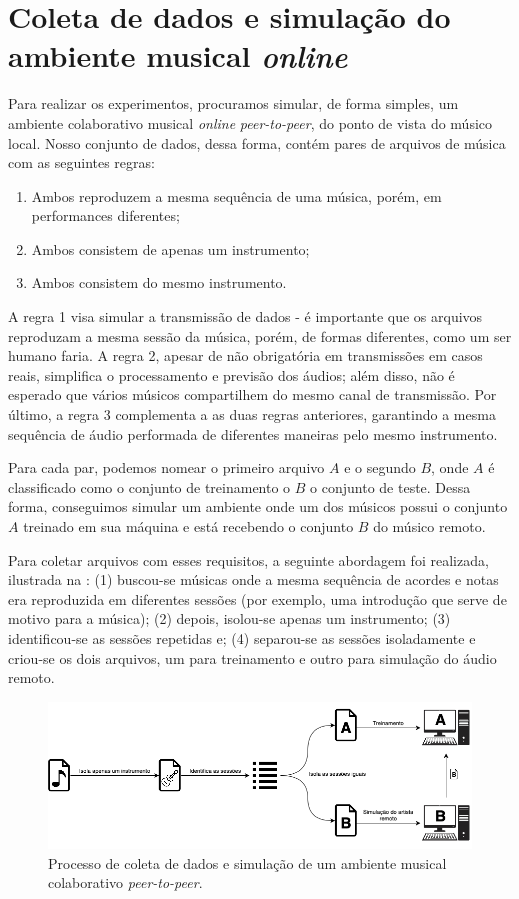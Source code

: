 \section{Coleta de dados e simulação do ambiente musical \textit{online}}

Para realizar os experimentos, procuramos simular, de forma simples, um ambiente colaborativo musical \textit{online} \textit{peer-to-peer}, do ponto de vista do músico local. Nosso conjunto de dados, dessa forma, contém pares de arquivos de música com as seguintes regras:

\begin{enumerate}
    \item Ambos reproduzem a mesma sequência de uma música, porém, em performances diferentes;
    \item Ambos consistem de apenas um instrumento;
    \item Ambos consistem do mesmo instrumento.
\end{enumerate}

A regra 1 visa simular a transmissão de dados - é importante que os arquivos reproduzam a mesma sessão da música, porém, de formas diferentes, como um ser humano faria. A regra 2, apesar de não obrigatória em transmissões em casos reais, simplifica o processamento e previsão dos áudios; além disso, não é esperado que vários músicos compartilhem do mesmo canal de transmissão. Por último, a regra 3 complementa a as duas regras anteriores, garantindo a mesma sequência de áudio performada de diferentes maneiras pelo mesmo instrumento.

Para cada par, podemos nomear o primeiro arquivo $A$ e o segundo $B$, onde $A$ é classificado como o conjunto de treinamento o $B$ o conjunto de teste. Dessa forma, conseguimos simular um ambiente onde um dos músicos possui o conjunto $A$ treinado em sua máquina e está recebendo o conjunto $B$ do músico remoto.

Para coletar arquivos com esses requisitos, a seguinte abordagem foi realizada, ilustrada na : (1) buscou-se músicas onde a mesma sequência de acordes e notas era reproduzida em diferentes sessões (por exemplo, uma introdução que serve de motivo para a música); (2) depois, isolou-se apenas um instrumento; (3) identificou-se as sessões repetidas e; (4) separou-se as sessões isoladamente e criou-se os dois arquivos, um para treinamento e outro para simulação do áudio remoto.

\begin{figure}[htbp]
\centering
\includegraphics[width=1\textwidth]{images/data-gathering.png}
\caption{Processo de coleta de dados e simulação de um ambiente musical colaborativo \textit{peer-to-peer}.}
\label{fig:data_gathering}
\end{figure}


